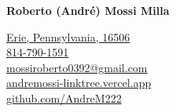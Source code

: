 \documentclass{../../Styles/AndreCV-RStyle}
\begin{document}
\begin{center}
	\textbf{\huge{Roberto (André) Mossi Milla}}\\

	\vspace{0.3cm}

	\small{
		\href{https://www.google.com/maps?q=42.127033,-80.088276}{Erie, Pennsylvania, 16506}\\
		\href{tel:+18147901591}{814-790-1591}\\
		\href{mailto:mossiroberto0392@gmail.com}{mossiroberto0392@gmail.com}\\
		\href{https://andremossi-linktree.vercel.app/}{andremossi-linktree.vercel.app}\\
		\href{https://github.com/AndreM222}{github.com/AndreM222}
	}
	\vspace{0.5cm}
\end{center}
\end{document}
